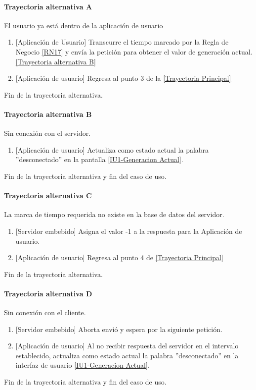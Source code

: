 \paragraph{Trayectoria alternativa A} \label{SUB-U-CU1.1:TA}
	El usuario ya está dentro de la aplicación de usuario
	\begin{enumerate}[label=A\arabic*.]
		\item {[Aplicación de Usuario]} Transcurre el tiempo marcado por la Regla de Negocio \ref{RN17} y envía la petición para obtener el valor de generación actual. \hyperref[SUB-U-CU1.1:TB]{[Trayectoria alternativa B]} 
		\item {[Aplicación de usuario]} Regresa al punto 3 de la \hyperref[SUB-U-CU1.1:TP]{[Trayectoria Principal]}
	\end{enumerate}
	Fin de la trayectoria alternativa.

\paragraph{Trayectoria alternativa B} \label{SUB-U-CU1.1:TB}
	Sin conexión con el servidor.
	\begin{enumerate}[label=B\arabic*.]
		\item {[Aplicación de usuario]} Actualiza como estado actual la palabra ''desconectado'' en la pantalla \hyperref[fig:monitoreo]{[IU1-Generacion Actual]}.
	\end{enumerate}
	Fin de la trayectoria alternativa y fin del caso de uso.

\paragraph{Trayectoria alternativa C} \label{SUB-U-CU1.1:TC}
	La marca de tiempo requerida no existe en la base de datos del servidor.
	\begin{enumerate}[label=C\arabic*.]
		\item {[Servidor embebido]} Asigna el valor -1 a la respuesta para la Aplicación de usuario.
		\item {[Aplicación de usuario]} Regresa al punto 4 de \hyperref[SUB-U-CU1.1:TP]{[Trayectoria Principal]}
	\end{enumerate}
	Fin de la trayectoria alternativa.

\paragraph{Trayectoria alternativa D} \label{SUB-U-CU1.1:TD}
	Sin conexión con el cliente.
	\begin{enumerate}[label=D\arabic*.]
		\item {[Servidor embebido]} Aborta envió y espera por la siguiente petición.
		\item {[Aplicación de usuario]} Al no recibir respuesta del servidor en el intervalo establecido, actualiza como estado actual la palabra ''desconectado'' en la interfaz de usuario \hyperref[fig:monitoreo]{[IU1-Generacion Actual]}.
	\end{enumerate}
	Fin de la trayectoria alternativa y fin del caso de uso.
	
